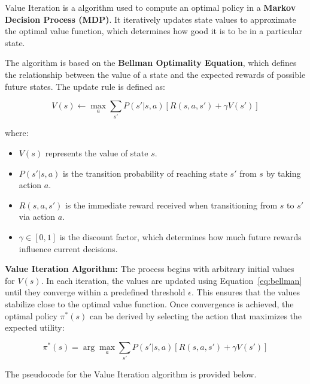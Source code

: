 Value Iteration is a algorithm used to compute an optimal policy in a \textbf{Markov Decision Process (MDP)}. It iteratively updates state values to approximate the optimal value function, which determines how good it is to be in a particular state. \vspace{10pt}

\noindent The algorithm is based on the \textbf{Bellman Optimality Equation}, which defines the relationship between the value of a state and the expected rewards of possible future states. The update rule is defined as:

\begin{equation}
    V(s) \leftarrow \max_{a} \sum_{s'} P(s'|s, a) \left[ R(s, a, s') + \gamma V(s') \right]
    \label{eq:bellman}
\end{equation}

where:
\begin{itemize}
    \item $V(s)$ represents the value of state $s$.
    \item $P(s'|s, a)$ is the transition probability of reaching state $s'$ from $s$ by taking action $a$.
    \item $R(s, a, s')$ is the immediate reward received when transitioning from $s$ to $s'$ via action $a$.
    \item $\gamma \in [0,1]$ is the discount factor, which determines how much future rewards influence current decisions.
\end{itemize}

\noindent \textbf{Value Iteration Algorithm:} The process begins with arbitrary initial values for $V(s)$. In each iteration, the values are updated using Equation~\eqref{eq:bellman} until they converge within a predefined threshold $\epsilon$. This ensures that the values stabilize close to the optimal value function. Once convergence is achieved, the optimal policy $\pi^*(s)$ can be derived by selecting the action that maximizes the expected utility:

\begin{equation}
    \pi^*(s) = \arg\max_{a} \sum_{s'} P(s'|s, a) \left[ R(s, a, s') + \gamma V(s') \right]
\end{equation}

\noindent The pseudocode for the Value Iteration algorithm is provided below.

